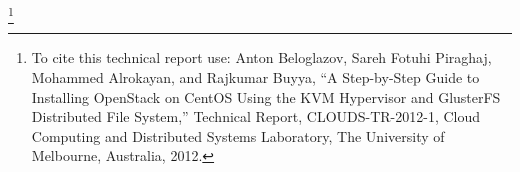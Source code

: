 \thanks{To cite this technical report use: Anton Beloglazov, Sareh Fotuhi Piraghaj, Mohammed Alrokayan, and Rajkumar Buyya, ``A Step-by-Step Guide to Installing OpenStack on CentOS Using the KVM Hypervisor and GlusterFS Distributed File System,'' Technical Report, CLOUDS-TR-2012-1, Cloud Computing and Distributed Systems Laboratory, The University of Melbourne, Australia, 2012.}
